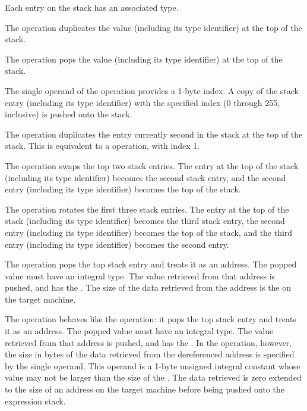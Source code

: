 Each entry on the stack has an associated type. 

\begin{enumerate}[1. ]
\itembfnl{\DWOPdupTARG}
The \DWOPdupNAME{} operation duplicates the value (including its 
type identifier) at the top of the stack.

\itembfnl{\DWOPdropTARG}
The \DWOPdropNAME{} operation pops the value (including its type 
identifier) at the top of the stack.

\itembfnl{\DWOPpickTARG}
The single operand of the \DWOPpickNAME{} operation provides a
1-byte index. A copy of the stack entry (including its 
type identifier) with the specified
index (0 through 255, inclusive) is pushed onto the stack.

\itembfnl{\DWOPoverTARG}
The \DWOPoverNAME{} operation duplicates the entry currently second
in the stack at the top of the stack. 
This is equivalent to a
\DWOPpick{} operation, with index 1.  

\itembfnl{\DWOPswapTARG}
The \DWOPswapNAME{} operation swaps the top two stack entries. 
The entry at the top of the stack (including its type identifier)
becomes the second stack entry, and the second entry (including 
its type identifier) becomes the top of the stack.

\itembfnl{\DWOProtTARG}
The \DWOProtNAME{} operation rotates the first three stack
entries. The entry at the top of the stack (including its 
type identifier) becomes the third stack entry, the second 
entry (including its type identifier) becomes the top of 
the stack, and the third entry (including its type identifier)
becomes the second entry.

\itembfnl{\DWOPderefTARG}
The \DWOPderefNAME{} operation pops the top stack entry and 
treats it as an address. The popped value must have an integral type.
The value retrieved from that address is pushed, 
and has the \generictype{}.
The size of the data retrieved from the 
address is the  on the target machine.

\itembfnl{\DWOPderefsizeTARG}
The \DWOPderefsizeNAME{} operation behaves like the 
\DWOPderef{}
operation: it pops the top stack entry and treats it as an
address. The popped value must have an integral type.
The value retrieved from that address is pushed,
and has the \generictype{}.
In the \DWOPderefsizeNAME{} operation, however, the size in bytes
of the data retrieved from the dereferenced address is
specified by the single operand. This operand is a 1-byte
unsigned integral constant whose value may not be larger
than the size of the \generictype. The data
retrieved is zero extended to the size of an address on the
target machine before being pushed onto the expression stack.


\end{enumerate}
